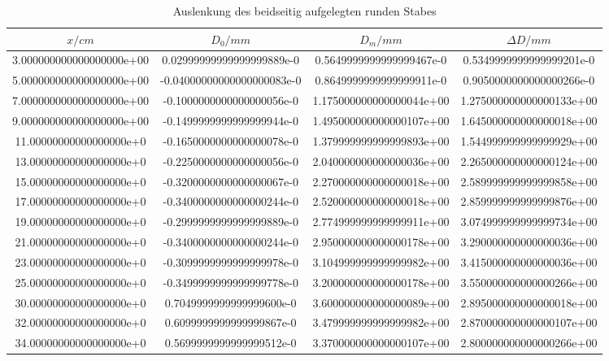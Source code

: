 \begin{table}
  \centering
  \caption{Auslenkung des beidseitig aufgelegten runden Stabes}
  \label{tab:Erb}
  \begin{tabular}{S S S S}
    \toprule
    {$x/cm$} & {$D_0 /mm$} & {$D_m / mm$} & {$\Delta D /mm$}\\
    \midrule
    3.000000000000000000e+00 & 0.02999999999999999889e-0 & 0.5649999999999999467e-0 & 0.5349999999999999201e-0\\
    5.000000000000000000e+00 & -0.04000000000000000083e-0 & 0.8649999999999999911e-0 & 0.9050000000000000266e-0\\
    7.000000000000000000e+00 & -0.1000000000000000056e-0 & 1.175000000000000044e+00 & 1.275000000000000133e+00\\
    9.000000000000000000e+00 & -0.1499999999999999944e-0 & 1.495000000000000107e+00 & 1.645000000000000018e+00\\
    11.00000000000000000e+0 & -0.1650000000000000078e-0 & 1.379999999999999893e+00 & 1.544999999999999929e+00\\
    13.00000000000000000e+0 & -0.2250000000000000056e-0 & 2.040000000000000036e+00 & 2.265000000000000124e+00\\
    15.00000000000000000e+0 & -0.3200000000000000067e-0 & 2.270000000000000018e+00 & 2.589999999999999858e+00\\
    17.00000000000000000e+0 & -0.3400000000000000244e-0 & 2.520000000000000018e+00 & 2.859999999999999876e+00\\
    19.00000000000000000e+0 & -0.2999999999999999889e-0 & 2.774999999999999911e+00 & 3.074999999999999734e+00\\
    21.00000000000000000e+0 & -0.3400000000000000244e-0 & 2.950000000000000178e+00 & 3.290000000000000036e+00\\
    23.00000000000000000e+0 & -0.3099999999999999978e-0 & 3.104999999999999982e+00 & 3.415000000000000036e+00\\
    25.00000000000000000e+0 & -0.3499999999999999778e-0 & 3.200000000000000178e+00 & 3.550000000000000266e+00\\
    30.00000000000000000e+0 & 0.7049999999999999600e-0 & 3.600000000000000089e+00 & 2.895000000000000018e+00\\
    32.00000000000000000e+0 & 0.6099999999999999867e-0 & 3.479999999999999982e+00 & 2.870000000000000107e+00\\
    34.00000000000000000e+0 & 0.5699999999999999512e-0 & 3.370000000000000107e+00 & 2.800000000000000266e+00\\

\end{tabular}
\end{table}
